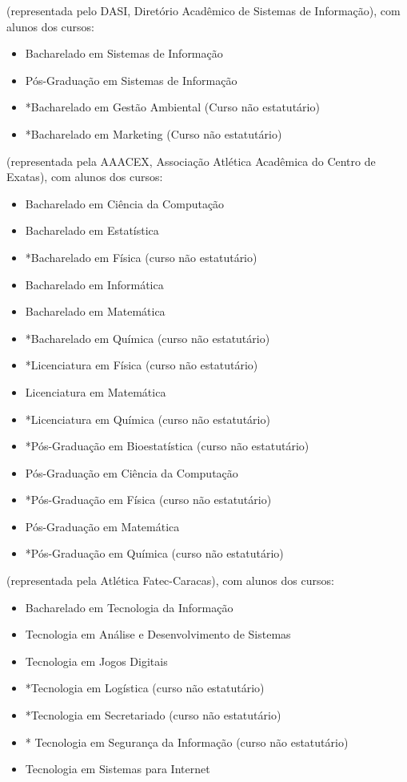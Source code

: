 \begin{article}
\begin{description}[noitemsep]
		\item[USP Leste - EACH] (representada pelo DASI, Diretório Acadêmico de Sistemas de Informação), com alunos dos cursos:
		\begin{itemize}[noitemsep]
			\item Bacharelado em Sistemas de Informação
			\item Pós-Graduação em Sistemas de Informação
			\item *Bacharelado em Gestão Ambiental (Curso não estatutário)
			\item *Bacharelado em Marketing (Curso não estatutário)
		\end{itemize}

		\item[UEM] (representada pela AAACEX, Associação Atlética Acadêmica do Centro de Exatas), com alunos dos cursos:
		\begin{itemize}[noitemsep]
			\item Bacharelado em Ciência da Computação
			\item Bacharelado em Estatística
			\item *Bacharelado em Física (curso não estatutário)
			\item Bacharelado em Informática
			\item Bacharelado em Matemática
			\item *Bacharelado em Química (curso não estatutário)
			\item *Licenciatura em Física (curso não estatutário)
			\item Licenciatura em Matemática
			\item *Licenciatura em Química (curso não estatutário)
			\item *Pós-Graduação em Bioestatística (curso não estatutário)
			\item Pós-Graduação em Ciência da Computação
			\item *Pós-Graduação em Física (curso não estatutário)
			\item Pós-Graduação em Matemática
			\item *Pós-Graduação em Química (curso não estatutário)
		\end{itemize}

		\item[Faculdade de Tecnologia - Carapicuíba] (representada pela Atlética Fatec-Caracas), com alunos dos cursos:
		\begin{itemize}[noitemsep]
			\item Bacharelado em Tecnologia da Informação
			\item Tecnologia em Análise e Desenvolvimento de Sistemas
			\item Tecnologia em Jogos Digitais
			\item *Tecnologia em Logística (curso não estatutário)
			\item *Tecnologia em Secretariado (curso não estatutário)
			\item * Tecnologia em Segurança da Informação (curso não estatutário)
			\item Tecnologia em Sistemas para Internet
		\end{itemize}


\end{description}
\end{article}
